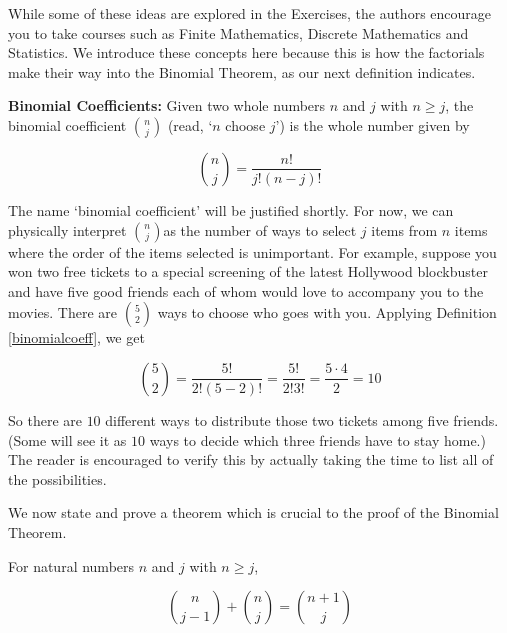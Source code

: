 \documentclass{ximera}
\begin{document}
\smallskip

 While some of these ideas are explored in the Exercises, the authors encourage you to take courses such as Finite Mathematics, Discrete Mathematics and Statistics. We introduce these concepts here because this is how the factorials make their way into the Binomial Theorem, as our next definition indicates.

\smallskip


\begin{definition} \label{binomialcoeff}  \textbf{Binomial Coefficients:}  Given two whole numbers $n$ and $j$ with $n \geq j$, the  binomial coefficient  {\boldmath $\displaystyle \binom{n}{j}$} (read, `$n$ choose $j$') is the whole number given by

\[ \binom{n}{j} = \dfrac{n!}{j! (n-j)!} \]

\end{definition}

\smallskip
 
The name `binomial coefficient' will be justified shortly.  For now, we can physically interpret $\binom{n}{j}$as the number of ways to select $j$ items from $n$ items where the order of the items selected is unimportant.   For example, suppose you won two free tickets to a special screening of the latest Hollywood blockbuster and have five good friends each of whom would love to accompany you to the movies.  There are $\binom{5}{2}$ ways to choose who goes with you.  Applying Definition \ref{binomialcoeff}, we get

\[ \binom{5}{2} = \dfrac{5!}{2! (5-2)!} = \dfrac{5!}{2! 3!} = \dfrac{5 \cdot 4}{2} = 10\] 

So there are $10$ different ways to distribute those two tickets among five friends. (Some will see it as $10$ ways to decide which three friends have to stay home.)  The reader is encouraged to verify this by actually taking the time to list all of the possibilities.  

\smallskip



We now state and prove a theorem which is crucial to the proof of the Binomial Theorem.

\smallskip


\begin{theorem}  \label{addbinomcoeff}  For natural numbers $n$ and $j$ with $n \geq j$, 

\[ \binom{n}{j-1} + \binom{n}{j} = \binom{n+1}{j} \]



\end{theorem}
\end{document}
